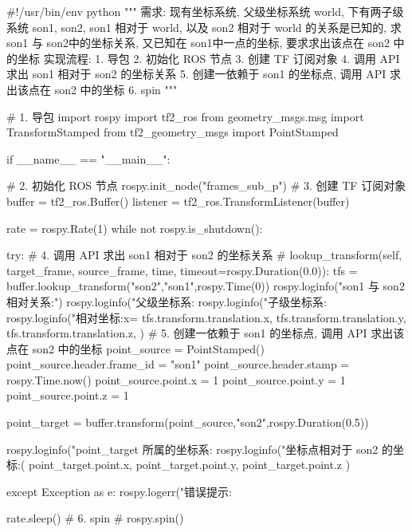 \documentclass[openany, fontset=windowsold]{ctexbook}
\theoremstyle{kaiti}
\theoremstyle{normal}
\begin{document}
\begin{python}
  #!/usr/bin/env python
  """  
      需求:
          现有坐标系统, 父级坐标系统 world, 下有两子级系统 son1, son2, 
          son1 相对于 world, 以及 son2 相对于 world 的关系是已知的, 
          求 son1 与 son2中的坐标关系, 又已知在 son1中一点的坐标, 要求求出该点在 son2 中的坐标
      实现流程:   
          1. 导包
          2. 初始化 ROS 节点
          3. 创建 TF 订阅对象
          4. 调用 API 求出 son1 相对于 son2 的坐标关系
          5. 创建一依赖于 son1 的坐标点, 调用 API 求出该点在 son2 中的坐标
          6. spin
  """

  # 1. 导包
  import rospy
  import tf2_ros
  from geometry_msgs.msg import TransformStamped
  from tf2_geometry_msgs import PointStamped

  if __name__ == "__main__":

      # 2. 初始化 ROS 节点
      rospy.init_node("frames_sub_p")
      # 3. 创建 TF 订阅对象
      buffer = tf2_ros.Buffer()
      listener = tf2_ros.TransformListener(buffer)

      rate = rospy.Rate(1)
      while not rospy.is_shutdown():

          try:
          # 4. 调用 API 求出 son1 相对于 son2 的坐标关系
              # lookup_transform(self, target_frame, source_frame, time, timeout=rospy.Duration(0.0)):
              tfs = buffer.lookup_transform("son2","son1",rospy.Time(0))
              rospy.loginfo("son1 与 son2 相对关系:")
              rospy.loginfo("父级坐标系:%
              rospy.loginfo("子级坐标系:%
              rospy.loginfo("相对坐标:x=%
                          tfs.transform.translation.x,
                          tfs.transform.translation.y,
                          tfs.transform.translation.z,
              )
          # 5. 创建一依赖于 son1 的坐标点, 调用 API 求出该点在 son2 中的坐标
              point_source = PointStamped()
              point_source.header.frame_id = "son1"
              point_source.header.stamp = rospy.Time.now()
              point_source.point.x = 1
              point_source.point.y = 1
              point_source.point.z = 1

              point_target = buffer.transform(point_source,"son2",rospy.Duration(0.5))

              rospy.loginfo("point_target 所属的坐标系:%
              rospy.loginfo("坐标点相对于 son2 的坐标:(%
                          point_target.point.x,
                          point_target.point.y,
                          point_target.point.z
              )

          except Exception as e:
              rospy.logerr("错误提示:%

          rate.sleep()
      # 6. spin    
      # rospy.spin()
\end{python}
\end{document}
